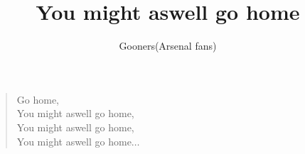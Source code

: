 \documentclass[a4paper,12pt]{article}
\title{You might aswell go home}
\author{Gooners(Arsenal fans)}
\date{}
\begin{document}
	
	\maketitle
	
	\begin{verse}
		
		Go home, \\
		You might aswell go home, \\
		You might aswell go home, \\
		You might aswell go home$\ldots$
		
	\end{verse}
	
\end{document}
